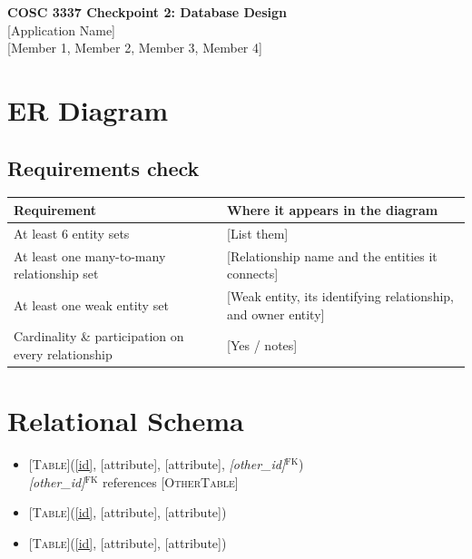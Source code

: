 \documentclass[11pt]{article}
\newcommand{\appname}{[Application Name]}
\newcommand{\members}{[Member 1, Member 2, Member 3, Member 4]}
\newcommand{\pk}[1]{\underline{#1}}
\newcommand{\fk}[1]{\textit{#1}$^{\mathrm{FK}}$}
\begin{document}
\begin{center}
  {\Large\bfseries COSC 3337 Checkpoint 2: Database Design}\\[4pt]
  {\large \appname{}}\\[2pt]
  \members
\end{center}

\section{ER Diagram}
\begin{center}
\end{center}

\subsection*{Requirements check}
\noindent\begin{tabularx}{\textwidth}{@{}lX@{}}
\toprule
Requirement & Where it appears in the diagram \\
\midrule
At least 6 entity sets & [List them] \\
At least one many-to-many relationship set & [Relationship name and the entities it connects] \\
At least one weak entity set & [Weak entity, its identifying relationship, and owner entity] \\
Cardinality \& participation on every relationship & [Yes / notes] \\
\bottomrule
\end{tabularx}

\section{Relational Schema}
\begin{itemize}
  \item \textsc{[Table]}(\pk{[id]}, [attribute], [attribute], \fk{[other\_id]})
    \\ \quad \fk{[other\_id]} references \textsc{[OtherTable]}
  \item \textsc{[Table]}(\pk{[id]}, [attribute], [attribute])
  \item \textsc{[Table]}(\pk{[id]}, [attribute], [attribute])
\end{itemize}
\end{document}

